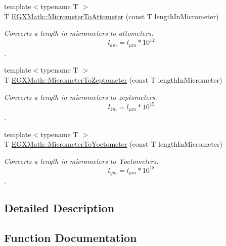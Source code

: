 \begin{DoxyCompactItemize}
{\footnotesize template$<$typename T $>$ }\\T \mbox{\hyperlink{group___e_g_x_math-_conversions-_length_conversions-_micrometer-_s_i_ga296eef01f570febc71c616741e02e561}{E\+G\+X\+Math\+::\+Micrometer\+To\+Attometer}} (const T length\+In\+Micrometer)
\begin{DoxyCompactList}\small\item\em Converts a length in micrometers to attometers. \[ l_{am}=l_{\mu m} * 10^{12} \]. \end{DoxyCompactList}\item 
{\footnotesize template$<$typename T $>$ }\\T \mbox{\hyperlink{group___e_g_x_math-_conversions-_length_conversions-_micrometer-_s_i_ga34a06da7fb2b2f8791f5beefd4727be8}{E\+G\+X\+Math\+::\+Micrometer\+To\+Zeptometer}} (const T length\+In\+Micrometer)
\begin{DoxyCompactList}\small\item\em Converts a length in micrometers to zeptometers. \[ l_{zm}=l_{\mu m} * 10^{15} \]. \end{DoxyCompactList}\item 
{\footnotesize template$<$typename T $>$ }\\T \mbox{\hyperlink{group___e_g_x_math-_conversions-_length_conversions-_micrometer-_s_i_ga58e346f8863d6679fecc09c55e253116}{E\+G\+X\+Math\+::\+Micrometer\+To\+Yoctometer}} (const T length\+In\+Micrometer)
\begin{DoxyCompactList}\small\item\em Converts a length in micrometers to Yoctometers. \[ l_{ym}=l_{\mu m} * 10^{18} \]. \end{DoxyCompactList}\end{DoxyCompactItemize}


\subsection{Detailed Description}


\subsection{Function Documentation}
\mbox{\label{group___e_g_x_math-_conversions-_length_conversions-_micrometer-_s_i_ga296eef01f570febc71c616741e02e561}} 
